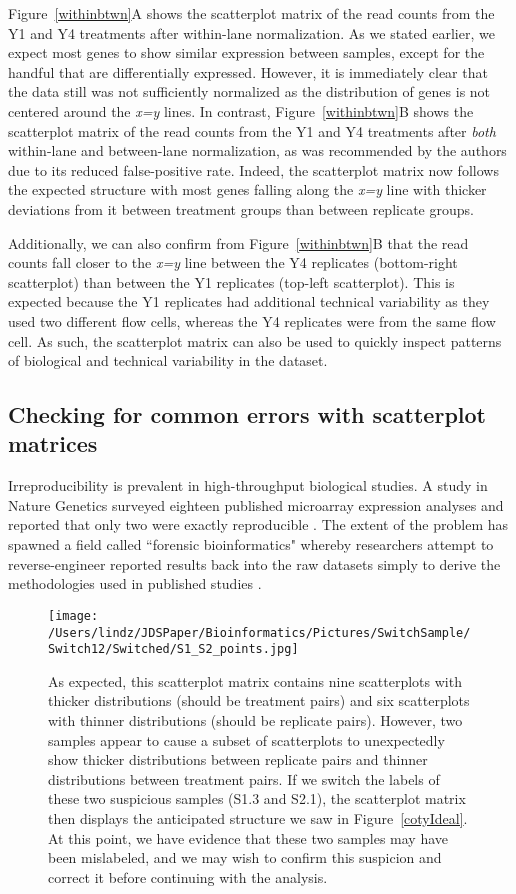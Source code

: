 \documentclass{bioinfo}
\begin{document}
Figure~\ref{withinbtwn}A shows the scatterplot matrix of the read counts from the Y1 and Y4 treatments after within-lane normalization. As we stated earlier, we expect most genes to show similar expression between samples, except for the handful that are differentially expressed. However, it is immediately clear that the data still was not sufficiently normalized as the distribution of genes is not centered around the \textit{x=y} lines. In contrast, Figure~\ref{withinbtwn}B shows the scatterplot matrix of the read counts from the Y1 and Y4 treatments after \textit{both} within-lane and between-lane normalization, as was recommended by the authors due to its reduced false-positive rate. Indeed, the scatterplot matrix now follows the expected structure with most genes falling along the \textit{x=y} line with thicker deviations from it between treatment groups than between replicate groups.

Additionally, we can also confirm from Figure~\ref{withinbtwn}B that the read counts fall closer to the \textit{x=y} line between the Y4 replicates (bottom-right scatterplot) than between the Y1 replicates (top-left scatterplot). This is expected because the Y1 replicates had additional technical variability as they used two different flow cells, whereas the Y4 replicates were from the same flow cell. As such, the scatterplot matrix can also be used to quickly inspect patterns of biological and technical variability in the dataset.

\subsection{Checking for common errors with scatterplot matrices}

Irreproducibility is prevalent in high-throughput biological studies. A study in Nature Genetics surveyed eighteen published microarray expression analyses and reported that only two were exactly reproducible \citep{Ioannidis}. The extent of the problem has spawned a field called ``forensic bioinformatics" whereby researchers attempt to reverse-engineer reported results back into the raw datasets simply to derive the methodologies used in published studies \citep{Baggerly}.

\begin{figure}[!tpb]
\centerline{\texttt{[image: /Users/lindz/JDSPaper/Bioinformatics/Pictures/SwitchSample/Switch12/Switched/S1\_S2\_points.jpg]}}
\caption{As expected, this scatterplot matrix contains nine scatterplots with thicker distributions (should be treatment pairs) and six scatterplots with thinner distributions (should be replicate pairs). However, two samples appear to cause a subset of scatterplots to unexpectedly show thicker distributions between replicate pairs and thinner distributions between treatment pairs. If we switch the labels of these two suspicious samples (S1.3 and S2.1), the scatterplot matrix then displays the anticipated structure we saw in Figure~\ref{cotyIdeal}. At this point, we have evidence that these two samples may have been mislabeled, and we may wish to confirm this suspicion and correct it before continuing with the analysis.
\label{switchedScatMat}}
\end{figure}
\end{document}
